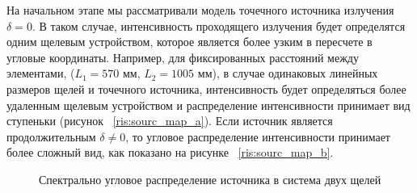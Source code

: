 На начальном этапе мы рассматривали модель точечного источника излучения $\delta = 0$.
В таком случае, интенсивность проходящего излучения будет определятся
одним щелевым устройством, которое является более узким в пересчете в угловые
координаты. Например, для фиксированных расстояний между элементами,
($L_1 = 570$ мм, $L_2 = 1005$ мм), в случае одинаковых линейных размеров щелей и точечного
источника, интенсивность будет определяться более удаленным щелевым устройством и
распределение интенсивности принимает вид ступеньки (рисунок ~\ref{ris:sourc_map_a}). Если источник является
 продолжительным $\delta \neq 0$, то угловое распределение интенсивности принимает более сложный вид, как показано на рисунке ~\ref{ris:sourc_map_b}.



 \begin{figure}[H]
   \centering
   \hfill
   \caption{Спектрально угловое распределение источника в система двух щелей}
   \label{ris:sourc_map}
 \end{figure}

